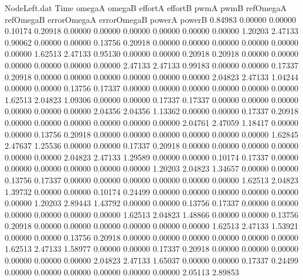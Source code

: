 \begin{filecontents}{NodeLeft.dat}
Time omegaA omegaB effortA effortB pwmA pwmB refOmegaA refOmegaB errorOmegaA errorOmegaB powerA powerB
   0.84983    0.00000    0.00000     0.10174    0.20918    0.00000    0.00000    0.00000    0.00000    0.00000    0.00000    1.20203    2.47133
   0.90062    0.00000    0.00000     0.13756    0.20918    0.00000    0.00000    0.00000    0.00000    0.00000    0.00000    1.62513    2.47133
   0.95130    0.00000    0.00000     0.20918    0.20918    0.00000    0.00000    0.00000    0.00000    0.00000    0.00000    2.47133    2.47133
   0.99183    0.00000    0.00000     0.17337    0.20918    0.00000    0.00000    0.00000    0.00000    0.00000    0.00000    2.04823    2.47133
   1.04244    0.00000    0.00000     0.13756    0.17337    0.00000    0.00000    0.00000    0.00000    0.00000    0.00000    1.62513    2.04823
   1.09306    0.00000    0.00000     0.17337    0.17337    0.00000    0.00000    0.00000    0.00000    0.00000    0.00000    2.04356    2.04356
   1.13362    0.00000    0.00000     0.17337    0.20918    0.00000    0.00000    0.00000    0.00000    0.00000    0.00000    2.04761    2.47059
   1.18417    0.00000    0.00000     0.13756    0.20918    0.00000    0.00000    0.00000    0.00000    0.00000    0.00000    1.62845    2.47637
   1.25536    0.00000    0.00000     0.17337    0.20918    0.00000    0.00000    0.00000    0.00000    0.00000    0.00000    2.04823    2.47133
   1.29589    0.00000    0.00000     0.10174    0.17337    0.00000    0.00000    0.00000    0.00000    0.00000    0.00000    1.20203    2.04823
   1.34657    0.00000    0.00000     0.13756    0.17337    0.00000    0.00000    0.00000    0.00000    0.00000    0.00000    1.62513    2.04823
   1.39732    0.00000    0.00000     0.10174    0.24499    0.00000    0.00000    0.00000    0.00000    0.00000    0.00000    1.20203    2.89443
   1.43792    0.00000    0.00000     0.13756    0.17337    0.00000    0.00000    0.00000    0.00000    0.00000    0.00000    1.62513    2.04823
   1.48866    0.00000    0.00000     0.13756    0.20918    0.00000    0.00000    0.00000    0.00000    0.00000    0.00000    1.62513    2.47133
   1.53921    0.00000    0.00000     0.13756    0.20918    0.00000    0.00000    0.00000    0.00000    0.00000    0.00000    1.62513    2.47133
   1.58977    0.00000    0.00000     0.17337    0.20918    0.00000    0.00000    0.00000    0.00000    0.00000    0.00000    2.04823    2.47133
   1.65037    0.00000    0.00000     0.17337    0.24499    0.00000    0.00000    0.00000    0.00000    0.00000    0.00000    2.05113    2.89853

\end{filecontents}
